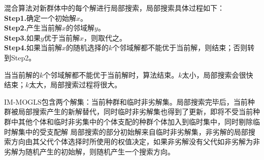             \par
            混合算法对新群体中的每个解进行局部搜索，局部搜索具体过程如下：\\
            \textbf{Step1.}确定一个初始解$x$。\\
            \textbf{Step2.}产生当前解$x$的邻域解$y$。\\
            \textbf{Step3.}如果$y$优于当前解$x$，则取代之。\\
            \textbf{Step4.}如果当前解$x$的随机选择的$k$个邻域解都不能优于当前解，则结束；否则转到Step2。
            \par
            当当前解的$k$个邻域解都不能优于当前解时，算法结束。$k$太小，局部搜索会很快结束；$k$太大，局部搜索过程将很大。
            \par
            IM-MOGLS包含两个解集：当前种群和临时非劣解集。局部搜索完毕后，当前种群被局部搜索产生的新解替代，同时临时非劣解集也得到了更新，即将不受当前种群中其他个体和临时非劣集中的个体支配的种群个体加入到临时集中，同时剔除临时解集中的受支配解
            局部搜索的部分初始解来自临时非劣解集，非劣解的局部搜索方向由其父代个体选择时所使用的权值决定，如果非劣解没有父代如非劣解为非劣解为随机产生的初始解，则随机产生一个搜索方向。
